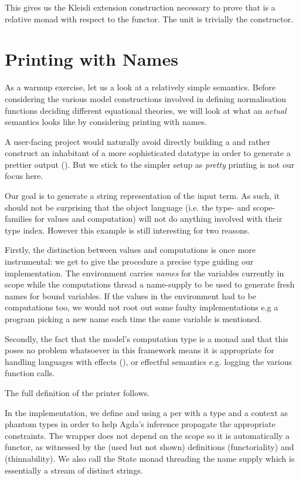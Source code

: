 This gives us the Kleisli extension construction necessary to prove
that  is a relative monad with respect to the 
functor. The unit is trivially the  constructor.

\section{Printing with Names}
\label{prettyprint}

As a warmup exercise, let us a look at a relatively simple semantics.
Before considering the various model constructions involved in defining
normalisation functions deciding different equational theories, we will
look at what an \emph{actual} semantics looks like by considering printing
with names.

A user-facing project would naturally avoid directly building a 
and rather construct an inhabitant of a more sophisticated datatype in order
to generate a prettier output
(\cite{hughes1995design,wadler2003prettier,Bernardy:2017:PBG:3136534.3110250}).
But we stick to the simpler setup as \emph{pretty} printing is not our
focus here.

Our goal is to generate a string representation of the input term. As such,
it should not be surprising that the object language (i.e. the type- and scope-
families for values and computation) will not do anything involved with their
type index. However this example is still interesting for two reasons.

Firstly, the distinction between values and computations is once more instrumental:
we get to give the procedure
a precise type guiding our implementation. The environment carries \emph{names}
for the variables currently in scope while the computations thread a name-supply
to be used to generate fresh names for bound variables. If the values in the
environment had to be computations too, we would not root out some faulty
implementations e.g a program picking a new name each time the same variable
is mentioned.

Secondly, the fact that the model's computation type is a monad and that this
poses no problem whatsoever in this framework means it is appropriate for
handling languages with effects (\cite{moggi1991notions}), or effectful
semantics e.g. logging the various function calls.

The full definition of the printer follows.

In the implementation, we define  and  using a per
with a type and a context as phantom types in order to help Agda's inference
propagate the appropriate constraints. The wrapper  does not depend on
the scope  so it is automatically a  functor, as witnessed by
the (used but not shown) definitions 
(functoriality) and  (thinnability).
%
We also call  the State monad threading the name supply which is
essentially a stream of distinct strings.

